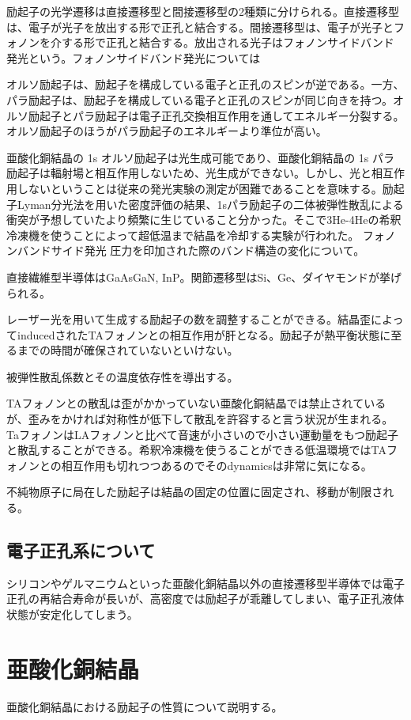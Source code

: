 励起子の光学遷移は直接遷移型と間接遷移型の2種類に分けられる。直接遷移型は、電子が光子を放出する形で正孔と結合する。間接遷移型は、電子が光子とフォノンを介する形で正孔と結合する。放出される光子はフォノンサイドバンド発光という。フォノンサイドバンド発光については

オルソ励起子は、励起子を構成している電子と正孔のスピンが逆である。一方、パラ励起子は、励起子を構成している電子と正孔のスピンが同じ向きを持つ。オルソ励起子とパラ励起子は電子正孔交換相互作用を通してエネルギー分裂する。オルソ励起子のほうがパラ励起子のエネルギーより準位が高い。

亜酸化銅結晶の 1s オルソ励起子は光生成可能であり、亜酸化銅結晶の 1s パラ励起子は輻射場と相互作用しないため、光生成ができない。しかし、光と相互作用しないということは従来の発光実験の測定が困難であることを意味する。励起子Lyman分光法を用いた密度評価の結果、1sパラ励起子の二体被弾性散乱による衝突が予想していたより頻繁に生じていること分かった。そこで3He-4Heの希釈冷凍機を使うことによって超低温まで結晶を冷却する実験が行われた。
フォノンバンドサイド発光
圧力を印加された際のバンド構造の変化について。

直接繊維型半導体はGaAsGaN, InP。関節遷移型はSi、Ge、ダイヤモンドが挙げられる。

レーザー光を用いて生成する励起子の数を調整することができる。結晶歪によってinducedされたTAフォノンとの相互作用が肝となる。励起子が熱平衡状態に至るまでの時間が確保されていないといけない。

被弾性散乱係数とその温度依存性を導出する。

TAフォノンとの散乱は歪がかかっていない亜酸化銅結晶では禁止されているが、歪みをかければ対称性が低下して散乱を許容すると言う状況が生まれる。TaフォノンはLAフォノンと比べて音速が小さいので小さい運動量をもつ励起子と散乱することができる。希釈冷凍機を使うることができる低温環境ではTAフォノンとの相互作用も切れつつあるのでそのdynamicsは非常に気になる。

不純物原子に局在した励起子は結晶の固定の位置に固定され、移動が制限される。
\subsection{電子正孔系について}
シリコンやゲルマニウムといった亜酸化銅結晶以外の直接遷移型半導体では電子正孔の再結合寿命が長いが、高密度では励起子が乖離してしまい、電子正孔液体状態が安定化してしまう。

\newpage
\section{亜酸化銅結晶}
亜酸化銅結晶における励起子の性質について説明する。
